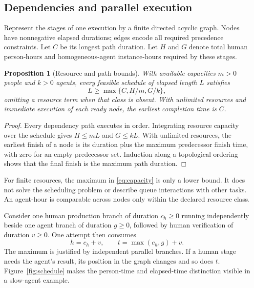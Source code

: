 \documentclass[11pt,a4paper]{amsart}
\newtheorem{proposition}{Proposition}[section]
\theoremstyle{definition}
\theoremstyle{remark}
\begin{document}
\subsection{Dependencies and parallel execution}

Represent the stages of one execution by a finite directed acyclic graph. Nodes have nonnegative elapsed durations; edges encode all required precedence constraints. Let $C$ be its longest path duration. Let $H$ and $G$ denote total human person-hours and homogeneous-agent instance-hours required by these stages.

\begin{proposition}[Resource and path bounds]
\label{prop:capacity}
With available capacities $m>0$ people and $k>0$ agents, every feasible schedule of elapsed length $L$ satisfies
\begin{equation}
\label{eq:capacity}
 L\geq\max\{C,H/m,G/k\},
\end{equation}
omitting a resource term when that class is absent. With unlimited resources and immediate execution of each ready node, the earliest completion time is $C$.
\end{proposition}

\begin{proof}
Every dependency path executes in order. Integrating resource capacity over the schedule gives $H\leq mL$ and $G\leq kL$. With unlimited resources, the earliest finish of a node is its duration plus the maximum predecessor finish time, with zero for an empty predecessor set. Induction along a topological ordering shows that the final finish is the maximum path duration.
\end{proof}

For finite resources, the maximum in \eqref{eq:capacity} is only a lower bound. It does not solve the scheduling problem or describe queue interactions with other tasks. An agent-hour is comparable across nodes only within the declared resource class.

Consider one human production branch of duration $c_h\geq0$ running independently beside one agent branch of duration $g\geq0$, followed by human verification of duration $v\geq0$. One attempt then consumes
\begin{equation}
\label{eq:parallel}
 h=c_h+v,\qquad t=\max(c_h,g)+v.
\end{equation}
The maximum is justified by independent parallel branches. If a human stage needs the agent's result, its position in the graph changes and so does $t$. Figure~\ref{fig:schedule} makes the person-time and elapsed-time distinction visible in a slow-agent example.
\end{document}
